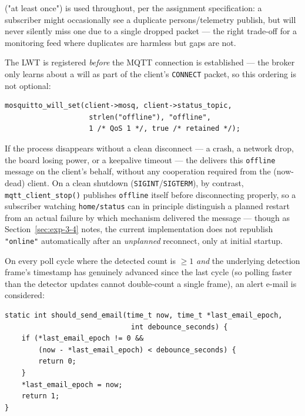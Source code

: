  ("at least once") is used throughout, per the assignment
specification: a subscriber might occasionally see a duplicate
persons/telemetry publish, but will never silently miss one due to a
single dropped packet --- the right trade-off for a monitoring feed where
duplicates are harmless but gaps are not.


The LWT is registered \emph{before} the MQTT connection is established
--- the broker only learns about a will as part of the client's
\texttt{CONNECT} packet, so this ordering is not optional:

\begin{lstlisting}[style=cstyle_bright_2026, caption={LWT registration in \texttt{mqtt\_client\_start()}, prior to \texttt{mosquitto\_connect()}.}, label={code:lwt-set}]
mosquitto_will_set(client->mosq, client->status_topic,
                    strlen("offline"), "offline",
                    1 /* QoS 1 */, true /* retained */);
\end{lstlisting}

If the process disappears without a clean disconnect --- a crash, a
network drop, the board losing power, or a keepalive timeout --- the
 delivers this \texttt{offline} message on the
client's behalf, without any cooperation required from the (now-dead)
client. On a clean shutdown (\texttt{SIGINT}/\texttt{SIGTERM}), by
contrast, \texttt{mqtt\_client\_stop()} publishes \texttt{offline}
itself before disconnecting properly, so a subscriber watching
\texttt{home/status} can in principle distinguish a planned restart from
an actual failure by which mechanism delivered the message --- though as
Section~\ref{sec:exp-3-4} notes, the current implementation does not
republish \texttt{"online"} automatically after an \emph{unplanned}
reconnect, only at initial startup.


On every poll cycle where the detected count is $\geq 1$ \emph{and} the
underlying detection frame's timestamp has genuinely advanced since the
last cycle (so polling faster than the detector updates cannot
double-count a single frame), an alert e-mail is considered:

\begin{lstlisting}[style=cstyle_bright_2026, caption={\texttt{should\_send\_email()} --- the debounce gate, from \texttt{main.c}.}, label={code:debounce}]
static int should_send_email(time_t now, time_t *last_email_epoch,
                              int debounce_seconds) {
    if (*last_email_epoch != 0 &&
        (now - *last_email_epoch) < debounce_seconds) {
        return 0;
    }
    *last_email_epoch = now;
    return 1;
}
\end{lstlisting}

